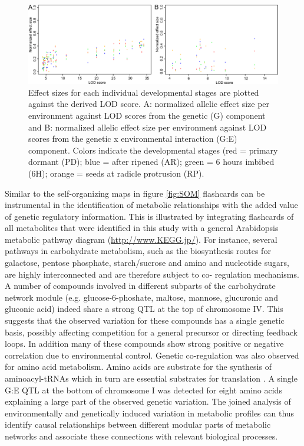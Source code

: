 \begin{figure}[!ht]
  \centering
  \includegraphics[keepaspectratio,scale=0.30]{eps/image_3_2_3.eps}
  \caption[Effect sizes]{Effect sizes for each individual developmental stages are plotted against the derived 
          LOD score. A: normalized allelic effect size per environment against LOD scores from the genetic (G) 
          component and B: normalized allelic effect size per environment against LOD scores from the genetic 
          x environmental interaction (G:E) component. Colors indicate the developmental stages (red = primary 
          dormant (PD); blue = after ripened (AR); green = 6 hours imbibed (6H); orange = seeds at radicle protrusion (RP).}
          \label{fig:effectSizes}
\end{figure}

Similar to the self-organizing maps in figure \ref{fig:SOM} flashcards can be instrumental in the identification of 
metabolic relationships with the added value of genetic regulatory information. This is illustrated by 
integrating flashcards of all metabolites that were identified in this study with a general Arabidopsis 
metabolic pathway diagram (\url{http://www.KEGG.jp/}). For instance, several pathways in 
carbohydrate metabolism, such as the biosynthesis routes for galactose, pentose phosphate, starch/sucrose 
and amino and nucleotide sugars, are highly interconnected and are therefore subject to co- regulation 
mechanisms. A number of compounds involved in different subparts of the carbohydrate network module (e.g. 
glucose-6-phoshate, maltose, mannose, glucuronic and gluconic acid) indeed share a strong QTL at the top 
of chromosome IV. This suggests that the observed variation for these compounds has a single genetic basis, 
possibly affecting competition for a general precursor or directing feedback loops. In addition many of 
these compounds show strong positive or negative correlation due to environmental control. Genetic 
co-regulation was also observed for amino acid metabolism. Amino acids are substrate for the synthesis of 
aminoacyl-tRNAs which in turn are essential substrates for translation \cite{Sheppard:2008}. A single 
G:E QTL at the bottom of chromosome I was detected for eight amino acids explaining a large part of the 
observed genetic variation. The joined analysis of environmentally and genetically induced variation in 
metabolic profiles can thus identify causal relationships between different modular parts of metabolic 
networks and associate these connections with relevant biological processes.

